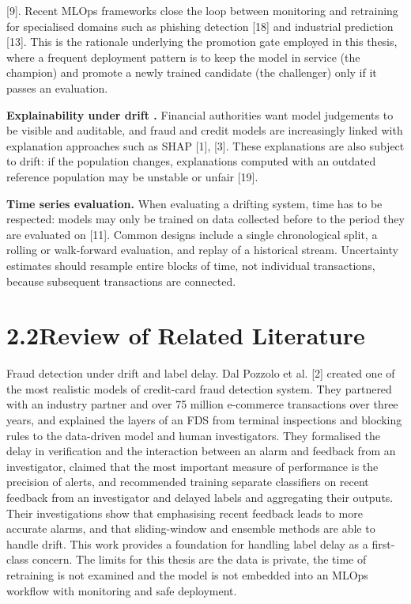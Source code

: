 \documentclass[11pt,letterpaper]{report}
\begin{document}
[9]. Recent MLOps frameworks close the loop between monitoring and retraining for specialised domains such as phishing detection [18] and industrial prediction [13]. This is the rationale underlying the promotion gate employed in this thesis, where a frequent deployment pattern is to keep the model in service (the champion) and promote a newly trained candidate (the challenger) only if it passes an evaluation.

\textbf{Explainability under drift .} Financial authorities want model judgements to be visible and auditable, and fraud and credit models are increasingly linked with explanation approaches such as SHAP [1], [3]. These explanations are also subject to drift: if the population changes, explanations computed with an outdated reference population may be unstable or unfair [19].

\textbf{Time series evaluation.} When evaluating a drifting system, time has to be respected: models may only be trained on data collected before to the period they are evaluated on [11]. Common designs include a single chronological split, a rolling or walk-forward evaluation, and replay of a historical stream. Uncertainty estimates should resample entire blocks of time, not individual transactions, because subsequent transactions are connected.

\section*{2.2\quad Review of Related Literature}

Fraud detection under drift and label delay. Dal Pozzolo et al. [2] created one of the most realistic models of credit-card fraud detection system. They partnered with an industry partner and over 75 million e-commerce transactions over three years, and explained the layers of an FDS from terminal inspections and blocking rules to the data-driven model and human investigators. They formalised the delay in verification and the interaction between an alarm and feedback from an investigator, claimed that the most important measure of performance is the precision of alerts, and recommended training separate classifiers on recent feedback from an investigator and delayed labels and aggregating their outputs. Their investigations show that emphasising recent feedback leads to more accurate alarms, and that sliding-window and ensemble methods are able to handle drift. This work provides a foundation for handling label delay as a first-class concern. The limits for this thesis are the data is private, the time of retraining is not examined and the model is not embedded into an MLOps workflow with monitoring and safe deployment.
\end{document}
